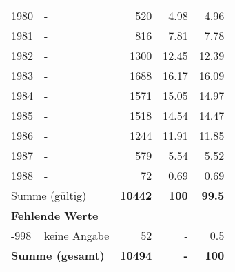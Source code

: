 \begin{longtable}{lXrrr}
        1980 & \multicolumn{1}{X}{-} & %
          \num{520} &
          \num[round-mode=places,round-precision=2]{4.98} &
          \num[round-mode=places,round-precision=2]{4.96} \\

        1981 & \multicolumn{1}{X}{-} & %
          \num{816} &
          \num[round-mode=places,round-precision=2]{7.81} &
          \num[round-mode=places,round-precision=2]{7.78} \\

        1982 & \multicolumn{1}{X}{-} & %
          \num{1300} &
          \num[round-mode=places,round-precision=2]{12.45} &
          \num[round-mode=places,round-precision=2]{12.39} \\

        1983 & \multicolumn{1}{X}{-} & %
          \num{1688} &
          \num[round-mode=places,round-precision=2]{16.17} &
          \num[round-mode=places,round-precision=2]{16.09} \\

        1984 & \multicolumn{1}{X}{-} & %
          \num{1571} &
          \num[round-mode=places,round-precision=2]{15.05} &
          \num[round-mode=places,round-precision=2]{14.97} \\

        1985 & \multicolumn{1}{X}{-} & %
          \num{1518} &
          \num[round-mode=places,round-precision=2]{14.54} &
          \num[round-mode=places,round-precision=2]{14.47} \\

        1986 & \multicolumn{1}{X}{-} & %
          \num{1244} &
          \num[round-mode=places,round-precision=2]{11.91} &
          \num[round-mode=places,round-precision=2]{11.85} \\

        1987 & \multicolumn{1}{X}{-} & %
          \num{579} &
          \num[round-mode=places,round-precision=2]{5.54} &
          \num[round-mode=places,round-precision=2]{5.52} \\

        1988 & \multicolumn{1}{X}{-} & %
          \num{72} &
          \num[round-mode=places,round-precision=2]{0.69} &
          \num[round-mode=places,round-precision=2]{0.69} \\

     \midrule
     \multicolumn{2}{l}{Summe (gültig)} &
       \textbf{\num{10442}} &
     \textbf{\num{100}} &
       \textbf{\num[round-mode=places,round-precision=2]{99.5}} \\
     \multicolumn{5}{l}{\textbf{Fehlende Werte}}\\
       -998 &
       keine Angabe &
         \num{52} &
        - &
         \num[round-mode=places,round-precision=2]{0.5} \\
     \midrule
     \multicolumn{2}{l}{\textbf{Summe (gesamt)}} &
          \textbf{\num{10494}} &
        \textbf{-} &
        \textbf{\num{100}} \\
     \bottomrule
     \end{longtable}
     
